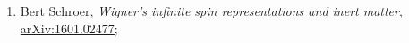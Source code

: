 \documentclass[a4paper,11pt]{article}
\begin{document}
\begin{enumerate}
\item Bert Schroer, \textit{Wigner's infinite spin representations and
    inert matter},
  \href{https://arxiv.org/abs/1601.02477}{arXiv:1601.02477};























































































\end{enumerate}










\end{document}
